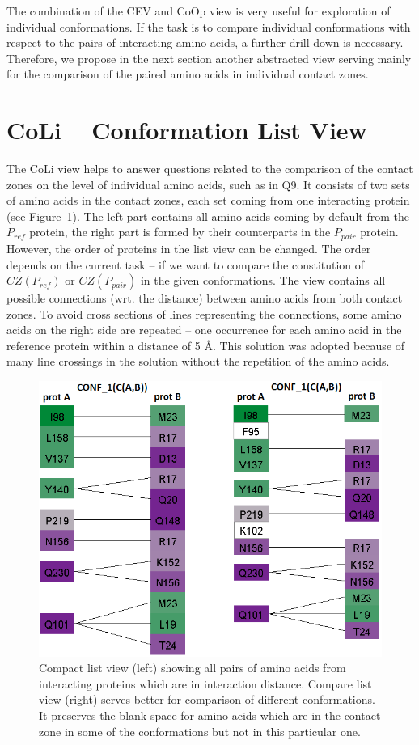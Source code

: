 \documentclass[journal]{vgtc}                %
\begin{document}
The combination of the CEV and CoOp view is very useful for exploration of individual conformations.
If the task is to compare individual conformations with respect to the pairs of interacting amino acids, a further drill-down is necessary.
Therefore, we propose in the next section another abstracted view serving mainly for the comparison of the paired amino acids in individual contact zones.

\section{CoLi -- Conformation List View}
The CoLi view helps to answer questions related to the comparison of the contact zones on the level of individual amino acids, such as in Q9.
It consists of two sets of amino acids in the contact zones, each set coming from one interacting protein (see Figure~\ref{fig:list}).
The left part contains all amino acids coming by default from the $P_{ref}$ protein, the right part is formed by their counterparts in the $P_{pair}$ protein.
However, the order of proteins in the list view can be changed.
The order depends on the current task -- if we want to compare the constitution of $CZ(P_{ref})$ or $CZ(P_{pair})$ in the given conformations.
The view contains all possible connections (wrt. the distance) between amino acids from both contact zones.
To avoid cross sections of lines representing the connections, some amino acids on the right side are repeated -- one occurrence for each amino acid in the reference protein within a distance of 5 \AA. 
This solution was adopted because of many line crossings in the solution without the repetition of the amino acids.

\begin{figure}[bt]
  \centering
  \includegraphics[width=1.0\columnwidth]{list.png}
  \caption{Compact list view (left) showing all pairs of amino acids from interacting proteins which are in interaction distance. Compare list view (right) serves better for comparison of different conformations. It preserves the blank space for amino acids which are in the contact zone in some of the conformations but not in this particular one.}
  \label{fig:list}
\end{figure}
\end{document}
